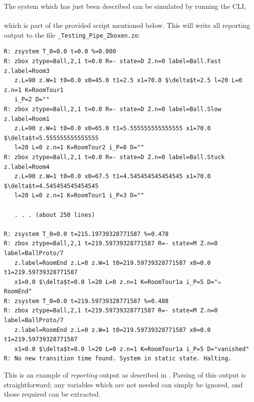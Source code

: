 The system which has just been described can be simulated by running the CLI, \\
\\
which is part of the provided script mentioned below.
This will write all reporting output to the file {\tt \_Testing\_Pipe\_Zboxen.zo}:
\begin{lstlisting}[mathescape]
R: zsystem T_0=0.0 t=0.0 %=0.000
R: zbox ztype=Ball,2,1 t=0.0 R=- state=D Z.n=0 label=Ball.Fast z.label=Room3
   z.L=90 z.W=1 t0=0.0 x0=45.0 t1=2.5 x1=70.0 $\delta$t=2.5 l=20 L=0 z.n=1 K=RoomTour1
   i_P=2 D=""
R: zbox ztype=Ball,2,1 t=0.0 R=- state=D Z.n=0 label=Ball.Slow z.label=Room1
   z.L=90 z.W=1 t0=0.0 x0=65.0 t1=5.555555555555555 x1=70.0 $\delta$t=5.555555555555555
   l=20 L=0 z.n=1 K=RoomTour2 i_P=0 D=""
R: zbox ztype=Ball,2,1 t=0.0 R=- state=D Z.n=0 label=Ball.Stuck z.label=Room4
   z.L=90 z.W=1 t0=0.0 x0=67.5 t1=4.545454545454545 x1=70.0 $\delta$t=4.545454545454545
   l=20 L=0 z.n=1 K=RoomTour1 i_P=3 D=""

   . . . (about 250 lines)

R: zsystem T_0=0.0 t=215.19739328771587 %=0.478
R: zbox ztype=Ball,2,1 t=219.59739328771587 R=- state=M Z.n=0 label=BallProto/7
   z.label=RoomEnd z.L=0 z.W=1 t0=219.59739328771587 x0=0.0 t1=219.59739328771587
   x1=0.0 $\delta$t=0.0 l=20 L=0 z.n=1 K=RoomTour1a i_P=5 D="⤷ RoomEnd"
R: zsystem T_0=0.0 t=219.59739328771587 %=0.488
R: zbox ztype=Ball,2,1 t=219.59739328771587 R=- state=M Z.n=0 label=BallProto/7
   z.label=RoomEnd z.L=0 z.W=1 t0=219.59739328771587 x0=0.0 t1=219.59739328771587
   x1=0.0 $\delta$t=0.0 l=20 L=0 z.n=1 K=RoomTour1a i_P=5 D="vanished"
R: No new transition time found. System in static state. Halting.
\end{lstlisting}

This is an example of \emph{reporting} output as described in .
Parsing of this output is straightforward; any variables which are not needed can
simply be ignored, and those required can be extracted.

